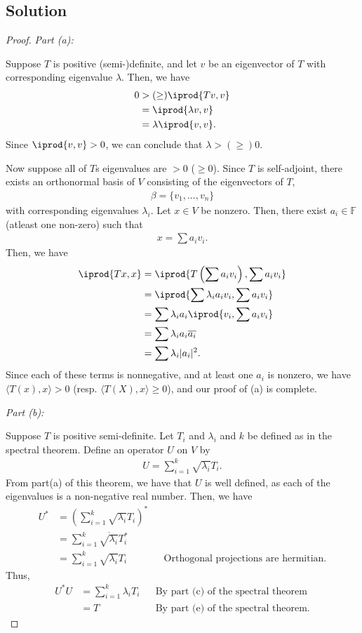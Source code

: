\documentclass[10pt,a4paper]{article}
\makeatletter
\newcommand{\proofpart}[2]{%
  \par
  \addvspace{\medskipamount}%
  \noindent\emph{Part #1: #2}\par\nobreak
  \addvspace{\smallskipamount}%
  \@afterheading
}
\theoremstyle{definition}
\makeatother
\begin{document}
\subsection*{Solution}
\begin{proof}
\proofpart{(a)}{}
Suppose $T$ is positive (semi-)definite, and let $v$ be an eigenvector of $T$ with corresponding eigenvalue $\lambda$. Then, we have
\begin{align*}
0 &> (\geq) \iprod{Tv, v}\\
&= \iprod{\lambda v, v}\\
&= \lambda \iprod{v, v}.
\end{align*}
Since $\iprod{v, v} > 0$, we can conclude that $\lambda > (\geq) 0$.

Now suppose all of $T$s eigenvalues are $>0$ ($\geq 0$). Since $T$ is self-adjoint, there exists an orthonormal basis of $V$ consisting of the eigenvectors of $T$,
\begin{align*}
\beta = \{v_1, ..., v_n\}
\end{align*}
with corresponding eigenvalues $\lambda_i$. Let $x \in V$ be nonzero. Then, there exist $a_i \in \mathbb{F}$ (atleast one non-zero) such that 
\begin{align*}
x = \sum a_i v_i.
\end{align*}
Then, we have
\begin{align*}
\iprod{Tx, x} &= \iprod{T \left(\sum a_i v_i \right), \sum a_i v_i}\\
&= \iprod{\sum \lambda_i a_i v_i, \sum a_i v_i}\\
&= \sum \lambda_i a_i \iprod{v_i, \sum a_i v_i}\\
&= \sum \lambda_i a_i \overline{a_i}\\
&= \sum \lambda_i |a_i|^2.
\end{align*}
Since each of these terms is nonnegative, and at least one $a_i$ is nonzero, we have $\langle T(x), x \rangle > 0$ (resp. $\langle T(X), x \rangle \geq 0$), and our proof of (a) is complete.

\proofpart{(b)}{}
Suppose $T$ is positive semi-definite. Let $T_i$ and $\lambda_i$ and $k$ be defined as in the spectral theorem. Define an operator $U$ on $V$ by 
\begin{align*}
U = \sum_{i=1}^k \sqrt{\lambda_i} T_i.
\end{align*}
From part(a) of this theorem, we have that $U$ is well defined, as each of the eigenvalues is a non-negative real number. Then, we have 
\begin{align*}
U^* &= \left(\sum_{i=1}^k \sqrt{\lambda_i} T_i \right)^*\\
&= \sum_{i=1}^k \overline{\sqrt{\lambda_i}} T^*_i\\
&= \sum_{i=1}^k \sqrt{\lambda_i} T_i &&\text{Orthogonal projections are hermitian}.
\end{align*}
Thus,
\begin{align*}
U^*U &= \sum_{i=1}^k \lambda_i T_i &&\text{By part (c) of the spectral theorem}\\
&= T &&\text{By part (e) of the spectral theorem.}
\end{align*}


\end{proof}
\end{document}
